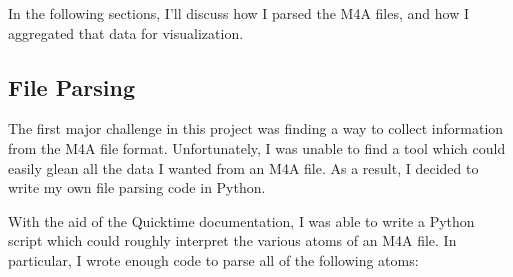 \documentclass[journal]{vgtc}                %
\begin{document}
In the following sections, I'll discuss how I parsed the M4A files, and how
I aggregated that data for visualization.

\subsection{File Parsing}

The first major challenge in this project was finding a way to collect
information from the M4A file format. Unfortunately, I was unable to find a
tool which could easily glean all the data I wanted from an M4A file. As a result,
I decided to write my own file parsing code in Python.

With the aid of the Quicktime documentation, I was able to write a Python script
which could roughly interpret the various atoms of an M4A file. In particular,
I wrote enough code to parse all of the following atoms:
\end{document}

